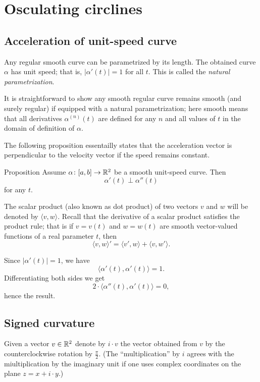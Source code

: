 \chapter{Osculating circlines}


\section{Acceleration of unit-speed curve}

Any regular smooth curve can be parametrized by its length.
The obtained curve $\alpha$ has unit speed; 
that is, $|\alpha'(t)|=1$ for all $t$.
This is called the \emph{natural parametrization}. 

It is straightforward to show any smooth regular curve remains smooth (and surely regular) if equipped with a natural parametrization; 
here smooth means that all derivatives $\alpha^{(n)}(t)$ are defined for any $n$ and all values of $t$ in the domain of definition of $\alpha$.

The following proposition essentailly states that the acceleration vector is perpendicular to the velocity vector if the speed remains constant.

\begin{thm}{Proposition}\label{prop:a'-pertp-a''}
Assume $\alpha\colon[a,b]\to\mathbb{R}^2$ be a smooth unit-speed curve.
Then 
\[\alpha'(t)\perp \alpha''(t)\]
for any $t$.
\end{thm}

The scalar product (also known as dot product) of two vectors $v$ and $w$ will be denoted by $\langle v,w\rangle$.
Recall that the derivative of a scalar product satisfies the product rule;
that is if $v=v(t)$ and $w=w(t)$ are smooth vector-valued functions of a real parameter $t$, then
\[\langle v,w\rangle'=\langle v',w\rangle+\langle v,w'\rangle.\]

Since $|\alpha'(t)|=1$, we have
\[\langle\alpha'(t),\alpha'(t)\rangle=1.\]
Differentiating both sides we get
\[2\cdot\langle\alpha''(t),\alpha'(t)\rangle=0,\]
hence the result.
\qeds

\section{Signed curvature}

Given a vector $v\in \mathbb{R}^2$ denote by $i\cdot v$ the vector obtained from $v$ by the counterclockwise rotation by $\tfrac\pi2$.
(The ``multiplication'' by $i$ agrees with the miultiplication by the imaginary unit if one uses  complex coordinates on the plane $z=x+i\cdot y$.)

